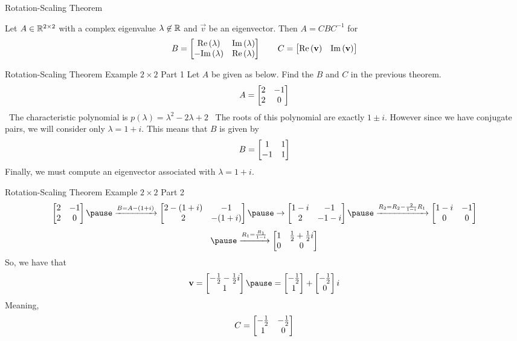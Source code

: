 \documentclass[xcoler=dvipsnames, aspectratio=169]{beamer}
\renewcommand{\Re}[1]{\textrm{Re}\left(#1\right)}
\renewcommand{\Im}[1]{\textrm{Im}\left(#1\right)}
\begin{document}
    \begin{frame}{Rotation-Scaling Theorem}
        \begin{theorem}
            Let $A\in\mathbb{R}^{2\times 2}$ with a complex eigenvalue $\lambda\not\in\mathbb{R}$ and $\vec{v}$ be
            an eigenvector. Then $A=CBC^{-1}$ for
            \[
                B = \bMat{
                    \Re{\lambda} & \Im{\lambda}\\
                    -\Im{\lambda}& \Re{\lambda}
                } \qquad C = \bMat{
                    \Re{\vec{v}} & \Im{\vec{v}}
                }
            \]
        \end{theorem}
    \end{frame}
    \begin{frame}{Rotation-Scaling Theorem Example $2\times 2$ Part 1}
    Let $A$ be given as below. Find the $B$ and $C$ in the previous theorem.
    \[
        A = \begin{bmatrix}
            2 & -1\\
            2 &  0
        \end{bmatrix}
    \]\pause\ The characteristic polynomial is $p(\lambda) = \lambda^2 - 2\lambda + 2$
    \pause\
    The roots of this polynomial are exactly $1\pm i$. However since we have conjugate pairs, we
        will consider only $\lambda=1+i$. This means that $B$ is given by
        \[
            B = \begin{bmatrix}
                1 & 1\\
                -1& 1
            \end{bmatrix}
        \]\pause
        Finally, we must compute an eigenvector associated with $\lambda=1+i$.
    \end{frame}
    \begin{frame}{Rotation-Scaling Theorem Example $2\times 2$ Part 2}
        \[
            \bMat{2 & -1\\2 & 0}\pause\xrightarrow{B=A-(1+i)}\bMat{
                2-(1+i) & -1\\
                2 & -(1+i)
            }\pause\rightarrow\bMat{
                1-i & -1\\
                2 & -1-i
            }\pause\xrightarrow{R_2=R_2 - \frac{2}{1-i}R_1}\bMat{1-i & -1\\0 & 0}
        \]
        \[
            \pause\xrightarrow{R_1 = \frac{R_1}{1-i}}\bMat{
                1 & \frac{1}{2} + \frac{1}{2}i\\
                0 & 0
            }
        \]\pause
        So, we have that 
        \[
            \vec{v} = \bMat{
                -\frac{1}{2} - \frac{1}{2}i\\
                1
            }\pause = \bMat{
                -\frac{1}{2}\\
                1
            } + \bMat{
                -\frac{1}{2}\\
                0
            }i
        \]\pause
        Meaning, 
        \[
            C = \begin{bmatrix}
                -\frac{1}{2} & -\frac{1}{2}\\
                1 & 0
            \end{bmatrix}
        \]
    \end{frame}
\end{document}
